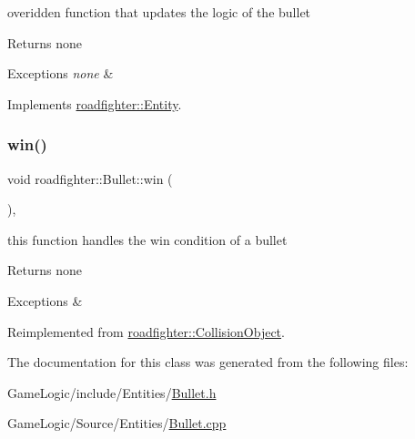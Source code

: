 overidden function that updates the logic of the bullet \begin{DoxyReturn}{Returns}
none 
\end{DoxyReturn}

\begin{DoxyExceptions}{Exceptions}
{\em none} & \\
\hline
\end{DoxyExceptions}


Implements \hyperlink{classroadfighter_1_1Entity_a54c00f1af306290bae3e4b84e196566b}{roadfighter\+::\+Entity}.

\mbox{\label{classroadfighter_1_1Bullet_a566adb0235665312365cd65536c2aafc}} 
\subsubsection{\texorpdfstring{win()}{win()}}
{\footnotesize\ttfamily void roadfighter\+::\+Bullet\+::win (\begin{DoxyParamCaption}{ }\end{DoxyParamCaption})\hspace{0.3cm}{\ttfamily [override]}, {\ttfamily [virtual]}}

this function handles the win condition of a bullet \begin{DoxyReturn}{Returns}
none 
\end{DoxyReturn}

\begin{DoxyExceptions}{Exceptions}
{\em } & \\
\hline
\end{DoxyExceptions}


Reimplemented from \hyperlink{classroadfighter_1_1CollisionObject_aa793e1b9943ee90bbb4129ddd06b9be7}{roadfighter\+::\+Collision\+Object}.



The documentation for this class was generated from the following files\+:\begin{DoxyCompactItemize}
\item 
Game\+Logic/include/\+Entities/\hyperlink{Bullet_8h}{Bullet.\+h}\item 
Game\+Logic/\+Source/\+Entities/\hyperlink{Bullet_8cpp}{Bullet.\+cpp}\end{DoxyCompactItemize}
